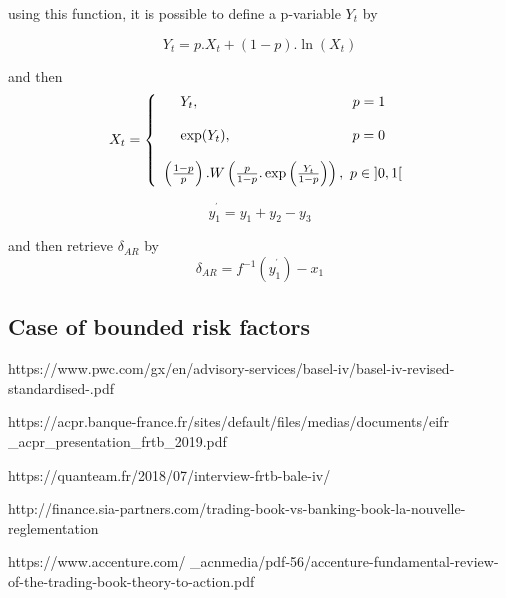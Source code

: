 \documentclass[3pt]{article}
\begin{document}
\bigskip using this function, it is possible to define a p-variable $Y_{t}$
by

\bigskip

\begin{equation*}
Y_{t}=p.X_{t}+(1-p).\ln (X_{t})
\end{equation*}

and then%
\begin{equation*}
X_{t}=\left\{ 
\begin{array}{c}
Y_{t},\text{ \ \ \ \ \ \ \ \ \ \ \ \ \ \ \ \ \ \ \ \ \ \ \ \ \ \ \ \ \ \ \ \ 
}p=1 \\ 
\\ 
\exp (Y_{t}),\text{ \ \ \ \ \ \ \ \ \ \ \ \ \ \ \ \ \ \ \ \ \ \ \ \ \ }p=0
\\ 
\\ 
\left( \frac{1-p}{p}\right) .W\left( \frac{p}{1-p}.\exp \left( \frac{Y_{t}}{%
1-p}\right) \right) ,\text{ }p\in \left] 0,1\right[%
\end{array}%
\right.
\end{equation*}

\begin{equation*}
y_{1}^{^{\prime }}=y_{1}+y_{2}-y_{3}
\end{equation*}

and then retrieve $\delta _{AR}$ by%
\begin{equation*}
\delta _{AR}=f^{-1}\left( y_{1}^{^{\prime }}\right) -x_{1}
\end{equation*}

\subsection{Case of bounded risk factors}

\bigskip

\bigskip

\bigskip

\bigskip

\bigskip
https://www.pwc.com/gx/en/advisory-services/basel-iv/basel-iv-revised-standardised-.pdf

https://acpr.banque-france.fr/sites/default/files/medias/documents/eifr%
\_acpr\_presentation\_frtb\_2019.pdf

https://quanteam.fr/2018/07/interview-frtb-bale-iv/

http://finance.sia-partners.com/trading-book-vs-banking-book-la-nouvelle-reglementation

https://www.accenture.com/%
\_acnmedia/pdf-56/accenture-fundamental-review-of-the-trading-book-theory-to-action.pdf
\end{document}
